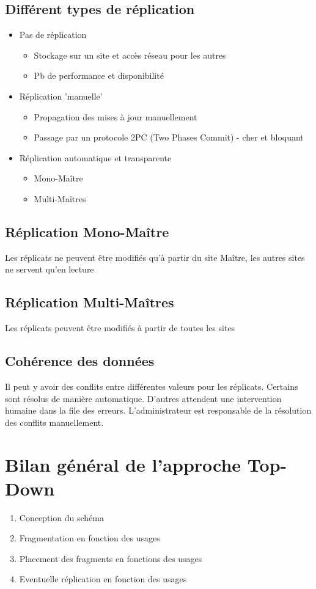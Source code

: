\documentclass[10pt,a4paper,twoside]{article}
\begin{document}
\subsection{Différent types de réplication}
\begin{itemize}
\item Pas de réplication
\begin{itemize}
\item Stockage sur un site et accès réseau pour les autres
\item Pb de performance et disponibilité
\end{itemize}
\item Réplication 'manuelle'
\begin{itemize}
\item Propagation des mises à jour manuellement
\item Passage par un protocole 2PC (Two Phases Commit) - cher et bloquant
\end{itemize}
\item Réplication automatique et transparente
\begin{itemize}
\item Mono-Maître
\item Multi-Maîtres
\end{itemize}
\end{itemize}

\subsection{Réplication Mono-Maître}
Les réplicats ne peuvent être modifiés qu'à partir du site Maître, les autres sites ne servent qu'en lecture

\subsection{Réplication Multi-Maîtres}
Les réplicats peuvent être modifiés à partir de toutes les sites

\subsection{Cohérence des données}
Il peut y avoir des conflits entre différentes valeurs pour les réplicats. Certains sont résolus de manière automatique. D'autres attendent une intervention humaine dans la file des erreurs. L'administrateur est responsable de la résolution des conflits manuellement.

\section{Bilan général de l'approche Top-Down}
\begin{enumerate}
\item Conception du schéma
\item Fragmentation en fonction des usages
\item Placement des fragments en fonctions des usages
\item Eventuelle réplication en fonction des usages
\end{enumerate}
\end{document}
